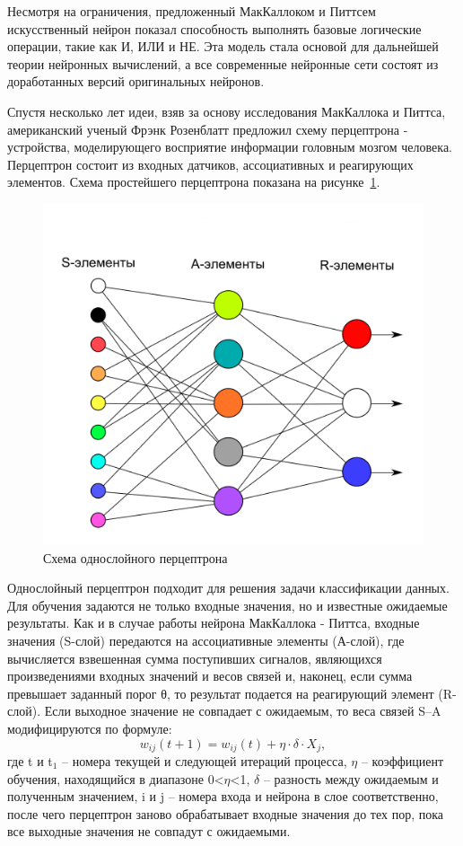 Несмотря на ограничения, предложенный МакКаллоком и Питтсем искусственный нейрон показал способность выполнять базовые логические операции, такие как И, ИЛИ и НЕ. Эта модель стала основой для дальнейшей теории нейронных вычислений, а все современные нейронные сети состоят из доработанных версий оригинальных нейронов. 

 Спустя несколько лет идеи, взяв за основу исследования МакКаллока и Питтса, американский ученый Фрэнк Розенблатт предложил схему перцептрона - устройства, моделирующего восприятие информации головным мозгом человека. Перцептрон состоит из входных датчиков, ассоциативных и реагирующих элементов\cite{perceptron}. Схема простейшего перцептрона показана на рисунке~\ref{fig:simpleperceptron}.
 
\begin{figure}[h]
	\centering
	\includegraphics[width=0.7\linewidth]{images/Simple_perceptron}
	\caption{Схема однослойного перцептрона}
	\label{fig:simpleperceptron}
\end{figure}
 
 Однослойный перцептрон подходит для решения задачи классификации данных. Для обучения задаются не только входные значения, но и известные ожидаемые результаты. Как и в случае работы нейрона МакКаллока - Питтса, входные значения (S-слой) передаются на ассоциативные элементы (А-слой), где вычисляется взвешенная сумма поступивших сигналов, являющихся произведениями входных значений и весов связей и, наконец, если сумма превышает заданный порог θ, то результат подается на реагирующий элемент (R-слой). Если выходное значение не совпадает с ожидаемым, то веса связей S--A модифицируются по формуле:
 \[
 w_{ij}(t+1) = w_{ij}(t) + \eta \cdot \delta \cdot X_{j},
 \]
 где t и t$_{1}$ -- номера текущей и следующей итераций процесса, $\eta$ -- коэффициент обучения, находящийся в диапазоне 0<$\eta$<1, $\delta$ -- разность между ожидаемым и полученным значением, i и j -- номера входа и нейрона в слое соответственно, после чего перцептрон заново обрабатывает входные значения до тех пор, пока все выходные значения не совпадут с ожидаемыми. 
 
